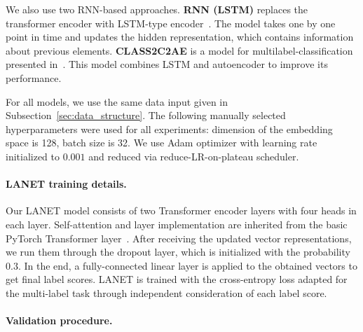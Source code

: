 \documentclass[runningheads]{llncs}
\begin{document}

We also use two RNN-based approaches. \textbf{RNN (LSTM)} replaces the transformer encoder with LSTM-type encoder~\cite{hochreiter1997long}. The model takes one by one point in time and updates the hidden representation, which contains information about previous elements. 
\textbf{CLASS2C2AE} is a model for multilabel-classification presented in~\cite{yeh2017learning}. This model combines LSTM and autoencoder to improve its performance.

For all models, we use the same data input given in Subsection~\ref{sec:data_structure}. 
The following manually selected hyperparameters were used for all experiments: dimension of the embedding space is 128, batch size is 32. We use Adam optimizer with learning rate initialized to $0.001$ and reduced via reduce-LR-on-plateau scheduler. 

\paragraph{LANET training details.} 
Our LANET model consists of two Transformer encoder layers with four heads in each layer. Self-attention and layer implementation are inherited from the basic PyTorch Transformer layer~\cite{transformer_encoder_torch}. After receiving the updated vector representations, we run them through the dropout layer, which is initialized with the probability $0.3$. In the end, a fully-connected linear layer is applied to the obtained vectors to get final label scores. LANET is trained with the cross-entropy loss adapted for the multi-label task through independent consideration of each label score.  


\paragraph{Validation procedure.} \label{sec:valid}
\end{document}
